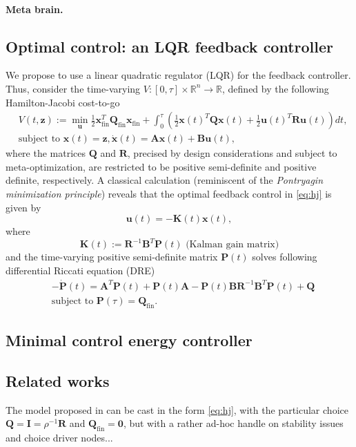 \documentclass{article} %
\def\B#1{\bm{#1}}
\newcommand{\R}{\mathbb{R}}
\def\u{\mathbf{u}}
\def\z{\mathbf{z}}
\def\A{\mathbf{A}}
\def\B{\mathbf{B}}
\def\R{\mathbf{R}}
\def\Q{\mathbf{Q}}
\def\P{\mathbf{P}}
\def\K{\mathbf{K}}
\def\x{\mathbf{x}}
\begin{document}
\paragraph{Meta brain.}

\subsection{Optimal control: an LQR feedback controller}
We propose to use a linear quadratic regulator (LQR) for the feedback controller. Thus, consider the time-varying  $V: [0, \tau] \times \mathbb R^n \rightarrow \mathbb R$, defined by the following Hamilton-Jacobi cost-to-go
\begin{equation}
  \begin{split}
    &V(t, \z) := \min_{\u} \frac{1}{2}\x_{\text{fin}}^T\Q_{\text{fin}}\x_{\text{fin}} + \int_{0}^\tau\left(\frac{1}{2}\x(t)^T\Q\x(t) + \frac{1}{2}\u(t)^T\R\u(t)\right)dt,\\
    &\text{subject to } \x(t) = \z, \dot{\x}(t) = \A\x(t) + \B\u(t),
  \end{split}
  \label{eq:hj}
\end{equation}
where the matrices $\Q$ and $\R$, precised by design considerations and subject to meta-optimization, are restricted to be positive semi-definite and positive definite, respectively. A classical calculation (reminiscent of the \textit{Pontryagin minimization principle}) reveals that the optimal feedback control in \eqref{eq:hj} is given by
\begin{equation}
  \u(t) = -\K(t)\x(t),
\end{equation}
where
\begin{equation}
  \K(t) := \R^{-1}\B^T\P(t)\text{ (Kalman gain matrix)}
\end{equation}
and the time-varying positive semi-definite matrix $\P(t)$ solves following differential Riccati equation (DRE)
\begin{equation}
\begin{split}
&-\dot{\P}(t) = \A^T\P(t) + \P(t)\A - \P(t)\B\R^{-1}\B^T\P(t) + \Q\\
&\text{subject to }\P(\tau) = \Q_{\text{fin}}.
\end{split}
\end{equation}
\subsection{Minimal control energy controller}
\subsection{Related works}
The model proposed in \cite{betzel2016} can be cast in the form \eqref{eq:hj}, with the particular choice $\Q = \textbf{I} = \rho^{-1}\R$ and $\Q_{\text{fin}} = \textbf{0}$, but with a rather ad-hoc handle on stability issues and choice driver nodes...
\end{document}

